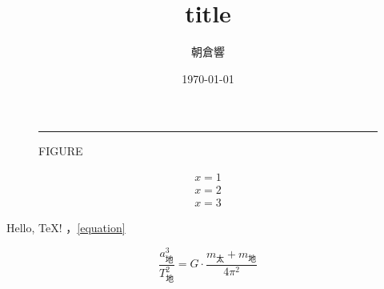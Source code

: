 \documentclass[fleqn]{ltjsarticle}
\title{title}
\author{朝倉響}
\date{\today}
\begin{document}
  \maketitle
  \begin{figure}[bthp]
    \centering
    \rule{0.45\hsize}{0.1\vsize}
    \caption{FIGURE}
    \label{figure}
  \end{figure}

  \begin{align}
    x=1\label{equation}\\x=2\\x=3
  \end{align}

  Hello, \TeX! ，\eqref{equation}

  \[ %
    \frac{a_{地}^3}{T_{地}^2} = G\cdot\frac{m_{太} + m_{地}}{4\pi^2}
  \]

\end{document}
